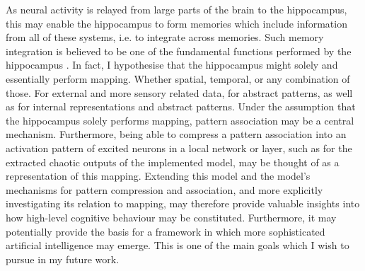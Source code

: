 
As neural activity is relayed from large parts of the brain to the hippocampus, this may enable the hippocampus to form memories which include information from all of these systems, i.e. to integrate across memories. Such memory integration is believed to be one of the fundamental functions performed by the hippocampus \citep{Rolls1998chpt1}.
In fact, I hypothesise that the hippocampus might solely and essentially perform mapping. Whether spatial, temporal, or any combination of those. For external and more sensory related data, for abstract patterns, as well as for internal representations and abstract patterns.
Under the assumption that the hippocampus solely performs mapping, pattern association may be a central mechanism. Furthermore, being able to compress a pattern association into an activation pattern of excited neurons in a local network or layer, such as for the extracted chaotic outputs of the implemented model, may be thought of as a representation of this mapping.
Extending this model and the model's mechanisms for pattern compression and association, and more explicitly investigating its relation to mapping, may therefore provide valuable insights into how high-level cognitive behaviour may be constituted. Furthermore, it may potentially provide the basis for a framework in which more sophisticated artificial intelligence may emerge. This is one of the main goals which I wish to pursue in my future work.
\\

